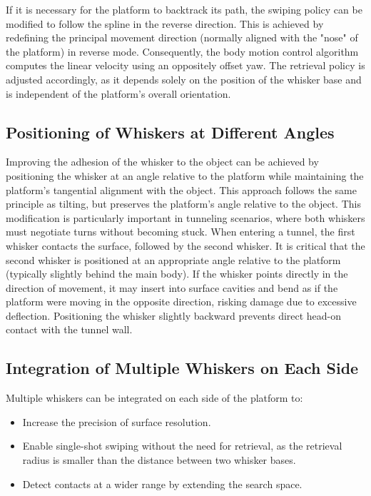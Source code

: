 If it is necessary for the platform to backtrack its path, the swiping policy can be modified to follow the spline in the reverse direction.
This is achieved by redefining the principal movement direction (normally aligned with the "nose" of the platform) in reverse mode.
Consequently, the body motion control algorithm computes the linear velocity using an oppositely offset yaw.
The retrieval policy is adjusted accordingly, as it depends solely on the position of the whisker base and is independent of the platform's overall orientation.

\subsection{Positioning of Whiskers at Different Angles}

Improving the adhesion of the whisker to the object can be achieved by positioning the whisker at an angle relative to the platform while maintaining the platform's tangential alignment with the object.
This approach follows the same principle as tilting, but preserves the platform's angle relative to the object.
This modification is particularly important in tunneling scenarios, where both whiskers must negotiate turns without becoming stuck.
When entering a tunnel, the first whisker contacts the surface, followed by the second whisker.
It is critical that the second whisker is positioned at an appropriate angle relative to the platform (typically slightly behind the main body).
If the whisker points directly in the direction of movement, it may insert into surface cavities and bend as if the platform were moving in the opposite direction, risking damage due to excessive deflection.
Positioning the whisker slightly backward prevents direct head-on contact with the tunnel wall.

\subsection{Integration of Multiple Whiskers on Each Side}

Multiple whiskers can be integrated on each side of the platform to:
\begin{itemize}
    \item Increase the precision of surface resolution.
    \item Enable single-shot swiping without the need for retrieval, as the retrieval radius is smaller than the distance between two whisker bases.
    \item Detect contacts at a wider range by extending the search space.
\end{itemize}


